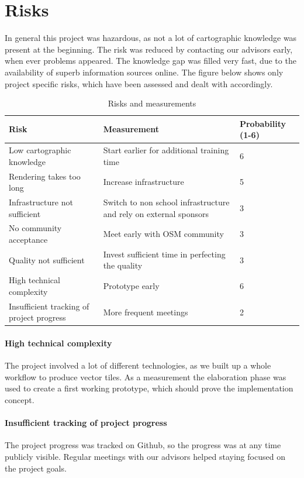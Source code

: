 \section{Risks}\label{risks}
In general this project was hazardous, as not a lot of cartographic knowledge was present at the beginning. The risk was reduced by contacting our advisors early, when ever problems appeared. The knowledge gap was filled very fast, due to the availability of superb information sources online. The figure below shows only project specific risks, which have been assessed and dealt with accordingly.

\begin{table}[H]
    \begin{tabular}{p{3.5cm} p{7.5cm} p{1.8cm}}
    \hline
    Risk & Measurement & Probability (1-6)\\
    \hline
    Low cartographic knowledge & Start earlier for additional training time & 6\\
    Rendering takes too long & Increase infrastructure & 5\\
    Infrastructure not sufficient & Switch to non school infrastructure and rely on external sponsors & 3\\
    No community acceptance & Meet early with OSM community & 3\\
    Quality not sufficient & Invest sufficient time in perfecting the quality & 3\\
    High technical complexity & Prototype early & 6\\
    Insufficient tracking of project progress & More frequent meetings & 2\\
    \end{tabular}
    \caption{Risks and measurements}
\end{table}

\paragraph{High technical complexity} The project involved a lot of different technologies, as we built up a whole workflow to produce vector tiles. As a measurement the elaboration phase was used to create a first working prototype, which should prove the implementation concept.

\paragraph{Insufficient tracking of project progress} The project progress was tracked on Github, so the progress was at any time publicly visible. Regular meetings with our advisors helped staying focused on the project goals.

